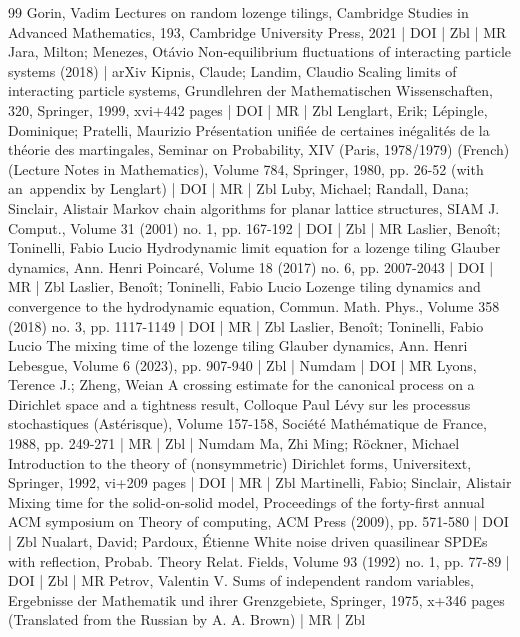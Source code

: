 \begin{thebibliography}{99}
 Gorin, Vadim Lectures on random lozenge tilings, Cambridge Studies in Advanced Mathematics, 193, Cambridge University Press, 2021 | DOI | Zbl | MR
 Jara, Milton; Menezes, Otávio Non-equilibrium fluctuations of interacting particle systems (2018) | arXiv
 Kipnis, Claude; Landim, Claudio Scaling limits of interacting particle systems, Grundlehren der Mathematischen Wissenschaften, 320, Springer, 1999, xvi+442 pages | DOI | MR | Zbl
 Lenglart, Erik; Lépingle, Dominique; Pratelli, Maurizio Présentation unifiée de certaines inégalités de la théorie des martingales, Seminar on Probability, XIV (Paris, 1978/1979) (French) (Lecture Notes in Mathematics), Volume 784, Springer, 1980, pp. 26-52 (with an appendix by Lenglart) | DOI | MR | Zbl
 Luby, Michael; Randall, Dana; Sinclair, Alistair Markov chain algorithms for planar lattice structures, SIAM J. Comput., Volume 31 (2001) no. 1, pp. 167-192 | DOI | Zbl | MR
 Laslier, Benoît; Toninelli, Fabio Lucio Hydrodynamic limit equation for a lozenge tiling Glauber dynamics, Ann. Henri Poincaré, Volume 18 (2017) no. 6, pp. 2007-2043 | DOI | MR | Zbl
 Laslier, Benoît; Toninelli, Fabio Lucio Lozenge tiling dynamics and convergence to the hydrodynamic equation, Commun. Math. Phys., Volume 358 (2018) no. 3, pp. 1117-1149 | DOI | MR | Zbl
 Laslier, Benoît; Toninelli, Fabio Lucio The mixing time of the lozenge tiling Glauber dynamics, Ann. Henri Lebesgue, Volume 6 (2023), pp. 907-940 | Zbl | Numdam | DOI | MR
 Lyons, Terence J.; Zheng, Weian A crossing estimate for the canonical process on a Dirichlet space and a tightness result, Colloque Paul Lévy sur les processus stochastiques (Astérisque), Volume 157-158, Société Mathématique de France, 1988, pp. 249-271 | MR | Zbl | Numdam
 Ma, Zhi Ming; Röckner, Michael Introduction to the theory of (nonsymmetric) Dirichlet forms, Universitext, Springer, 1992, vi+209 pages | DOI | MR | Zbl
 Martinelli, Fabio; Sinclair, Alistair Mixing time for the solid-on-solid model, Proceedings of the forty-first annual ACM symposium on Theory of computing, ACM Press (2009), pp. 571-580 | DOI | Zbl
 Nualart, David; Pardoux, Étienne White noise driven quasilinear SPDEs with reflection, Probab. Theory Relat. Fields, Volume 93 (1992) no. 1, pp. 77-89 | DOI | Zbl | MR
 Petrov, Valentin V. Sums of independent random variables, Ergebnisse der Mathematik und ihrer Grenzgebiete, Springer, 1975, x+346 pages (Translated from the Russian by A. A. Brown) | MR | Zbl

\end{thebibliography}
